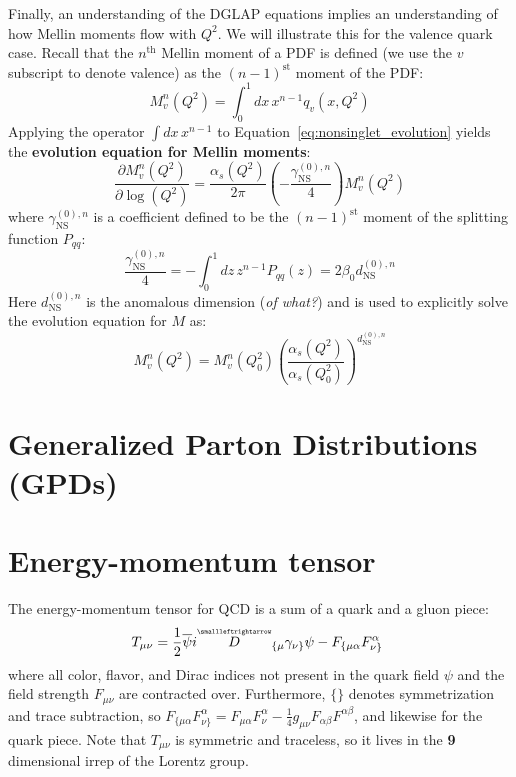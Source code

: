 \documentclass[11pt, oneside]{article}   	%
\theoremstyle{definition}
\newcommand{\cevvec}[1]{\overset{\scriptscriptstyle\smallleftrightarrow}{#1}}
\begin{document}
Finally, an understanding of the DGLAP equations implies an understanding of how Mellin moments flow with $Q^2$. We will illustrate this 
for the valence quark case. Recall that the $n^\mathrm{th}$ Mellin moment of a PDF is defined (we use the $v$ subscript to denote valence) 
as the $(n - 1)^\mathrm{st}$ moment of the PDF:
\begin{equation}
	M_v^n(Q^2) = \int_0^1 dx\,x^{n - 1} q_v(x, Q^2)
\end{equation}
Applying the operator $\int dx\,x^{n - 1}$ to Equation~\ref{eq:nonsinglet_evolution} yields the \textbf{evolution equation for Mellin moments}:
\begin{equation}
	\frac{\partial M_v^n(Q^2)}{\partial\log(Q^2)} = \frac{\alpha_s(Q^2)}{2\pi}\left(-\frac{\gamma_\mathrm{NS}^{(0), n}}{4}\right) M_v^n(Q^2)
\end{equation}
where $\gamma_\mathrm{NS}^{(0), n}$ is a coefficient defined to be the $(n - 1)^\mathrm{st}$ moment of the splitting function $P_{qq}$:
\begin{equation}
	\frac{\gamma_\mathrm{NS}^{(0), n}}{4} = -\int_0^1 dz\, z^{n - 1} P_{qq}(z) = 2\beta_0 d_\mathrm{NS}^{(0), n}
\end{equation}
Here $d_\mathrm{NS}^{(0), n}$ is the anomalous dimension (\textit{of what?}) and is used to explicitly solve the evolution equation for $M$ 
as:
\begin{equation}
	M_v^n(Q^2) = M_v^n(Q_0^2)\left(\frac{\alpha_s(Q^2)}{\alpha_s(Q_0^2)}\right)^{d_\mathrm{NS}^{(0), n}}
\end{equation}

\newpage
\section{Generalized Parton Distributions (GPDs)}

\newpage
\section{Energy-momentum tensor}

The energy-momentum tensor for QCD is a sum of a quark and a gluon piece:
\begin{equation}
	T_{\mu\nu} = \frac{1}{2}\overline\psi i \cevvec{D}_{\{\mu}\gamma_{\nu\}} \psi - F_{\{\mu\alpha} F_{\nu\}}^\alpha~
	\label{eq:qcd_emt}
\end{equation}
where all color, flavor, and Dirac indices not present in the quark field $\psi$ and the field strength $F_{\mu\nu}$ are 
contracted over. Furthermore, $\{\}$ denotes symmetrization and trace subtraction, so $F_{\{\mu\alpha} F_{\nu\}}^\alpha = 
F_{\mu\alpha} F_{\nu}^\alpha - \frac{1}{4} g_{\mu\nu}F_{\alpha\beta} F^{\alpha\beta}$, and likewise for the quark piece. 
Note that $T_{\mu\nu}$ is symmetric and traceless, so it lives in the \textbf{9} dimensional irrep of the Lorentz group. 
\end{document}
